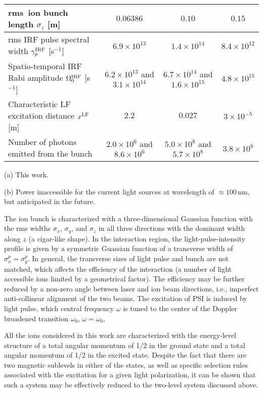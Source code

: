 \begin{table*}[!htbp]
\begin{threeparttable}
\begin{tabular}{l|c|c|c}
         rms\ ion bunch length $\sigma_z$ [m] & $0.06386$ & $0.10$& $0.15$  \\ \hline
         rms IRF pulse spectral width $\gamma_p^{\rm IRF}$ [s$^{-1}$] & $6.9\times 10^{13}$ & $1.4\times 10^{14}$ & $8.4\times 10^{12}$ \\
         Spatio-temporal IRF Rabi amplitude $\Omega_0^{\rm IRF}$ [s$^{-1}$] & $6.2\times 10^{13}$ and $3.1\times 10^{14}$ & $6.7\times 10^{14}$ and $1.6\times 10^{15}$ & $4.8\times 10^{15}$\\
         Characteristic LF excitation distance $x^{\rm LF}$ [m]  & $2.2$ & $0.027$ & $3\times 10^{-5}$ \\ \hline
         Number of photons emitted from the bunch  & $2.0\times 10^6$ and $8.6\times 10^{6}$ & $5.0\times 10^8$ and $5.7\times 10^8$ &  $3.8\times 10^{8}$\\
         \hline\hline
    \end{tabular}
    \begin{tablenotes}\footnotesize
      \item[(a)] This work.
      \item[(b)] Power inaccessible for the current light sources at wavelength of $\approx 100$\,nm, but anticipated in the future.
    \end{tablenotes}
    \end{threeparttable}
    \label{table:OpticalPumpingParameters}
\end{table*}

The ion bunch is characterized with a three-dimensional Gaussian function with the rms widths $\sigma_x$, $\sigma_y$, and $\sigma_z$ in all three directions with the dominant width along $z$ (a cigar-like shape).  In the interaction region, the light-pulse-intensity profile is given by a symmetric Guassian function of a transverse width of $\sigma^p_x=\sigma^p_y$.  In general, the transverse sizes of light pulse and bunch are not matched, which affects the efficiency of the interaction (a number of light accessible ions limited by a geometrical factor).  The efficiency may be further reduced by a non-zero angle between laser and ion beam directions, i.e., imperfect anti-collinear alignment of the two beams.  The excitation of PSI is induced by light pulse, which central frequency $\omega$ is tuned to the center of the Doppler broadened transition $\omega_0$, $\omega=\omega_0$.

All the ions considered in this work are characterized with the energy-level structure of a total angular momentum of 1/2 in the ground state and a total angular momentum of 1/2 in the excited state.  Despite the fact that there are two magnetic sublevels in either of the states, as well as specific selection rules associated with the excitation for a given light polarization, it can be shown that such a system may be effectively reduced to the two-level system discussed above.

